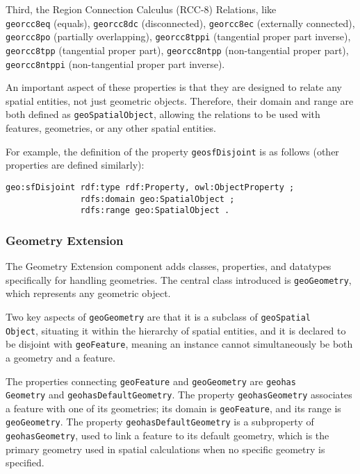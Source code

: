 Third, the Region Connection Calculus (RCC-8) Relations, like \\
\texttt{\gls{geo}rcc8eq} (equals), \texttt{\gls{geo}rcc8dc} (disconnected), \texttt{\gls{geo}rcc8ec} (externally connected), \texttt{\gls{geo}rcc8po} (partially overlapping), \texttt{\gls{geo}rcc8tppi} (tangential proper part inverse), \texttt{\gls{geo}rcc8tpp} (tangential proper part), \texttt{\gls{geo}rcc8ntpp} (non-tangential proper part), \texttt{\gls{geo}rcc8ntppi} (non-tangential proper part inverse).

An important aspect of these properties is that they are designed to relate any spatial entities, not just geometric objects. Therefore, their domain and range are both defined as \texttt{\gls{geo}SpatialObject}, allowing the relations to be used with features, geometries, or any other spatial entities.

For example, the definition of the property \texttt{\gls{geo}sfDisjoint} is as follows (other properties are defined similarly):

\begin{lstlisting}[caption=Definition of the property \texttt{geo:sfDisjoint} , label={lst:definition-disjoint}]
geo:sfDisjoint rdf:type rdf:Property, owl:ObjectProperty ;
               rdfs:domain geo:SpatialObject ;
               rdfs:range geo:SpatialObject .
\end{lstlisting}

\subsubsection{Geometry Extension}\label{III-subsubsec:geosparqlGeometry}

The Geometry Extension component adds classes, properties, and datatypes specifically for handling geometries. The central class introduced is \texttt{\gls{geo}Geometry}, which represents any geometric object.

Two key aspects of \texttt{\gls{geo}Geometry} are that it is a subclass of \texttt{\gls{geo}Spatial\\Object}, situating it within the hierarchy of spatial entities, and it is declared to be disjoint with \texttt{\gls{geo}Feature}, meaning an instance cannot simultaneously be both a geometry and a feature.

The properties connecting \texttt{\gls{geo}Feature} and \texttt{\gls{geo}Geometry} are \texttt{\gls{geo}has\\Geometry} and \texttt{\gls{geo}hasDefaultGeometry}. The property \texttt{\gls{geo}hasGeometry} associates a feature with one of its geometries; its domain is \texttt{\gls{geo}Feature}, and its range is \texttt{\gls{geo}Geometry}. The property \texttt{\gls{geo}hasDefaultGeometry} is a subproperty of \texttt{\gls{geo}hasGeometry}, used to link a feature to its default geometry, which is the primary geometry used in spatial calculations when no specific geometry is specified.

